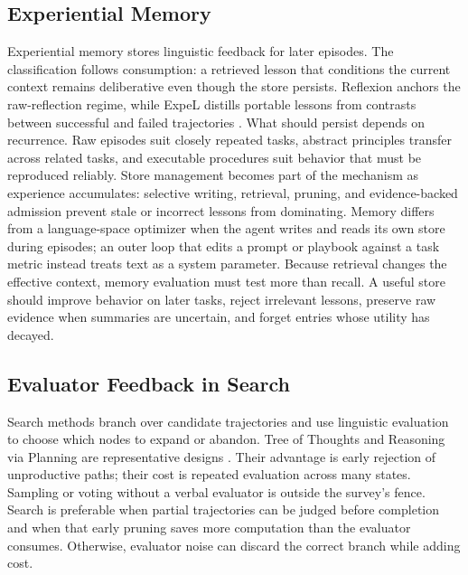 \subsection{Experiential Memory}
\label{subsec:memory}

Experiential memory stores linguistic feedback for later episodes. The classification follows consumption: a retrieved lesson that conditions the current context remains deliberative even though the store persists. Reflexion anchors the raw-reflection regime, while ExpeL distills portable lessons from contrasts between successful and failed trajectories \citep{shinn2023reflexion,zhao2024expel}. What should persist depends on recurrence. Raw episodes suit closely repeated tasks, abstract principles transfer across related tasks, and executable procedures suit behavior that must be reproduced reliably. Store management becomes part of the mechanism as experience accumulates: selective writing, retrieval, pruning, and evidence-backed admission prevent stale or incorrect lessons from dominating. Memory differs from a language-space optimizer when the agent writes and reads its own store during episodes; an outer loop that edits a prompt or playbook against a task metric instead treats text as a system parameter.
Because retrieval changes the effective context, memory evaluation must test more than recall. A useful store should improve behavior on later tasks, reject irrelevant lessons, preserve raw evidence when summaries are uncertain, and forget entries whose utility has decayed.

\subsection{Evaluator Feedback in Search}
\label{subsec:search}

Search methods branch over candidate trajectories and use linguistic evaluation to choose which nodes to expand or abandon. Tree of Thoughts and Reasoning via Planning are representative designs \citep{yao2023tree,hao2023reasoning}. Their advantage is early rejection of unproductive paths; their cost is repeated evaluation across many states. Sampling or voting without a verbal evaluator is outside the survey's fence.
Search is preferable when partial trajectories can be judged before completion and when that early pruning saves more computation than the evaluator consumes. Otherwise, evaluator noise can discard the correct branch while adding cost.

